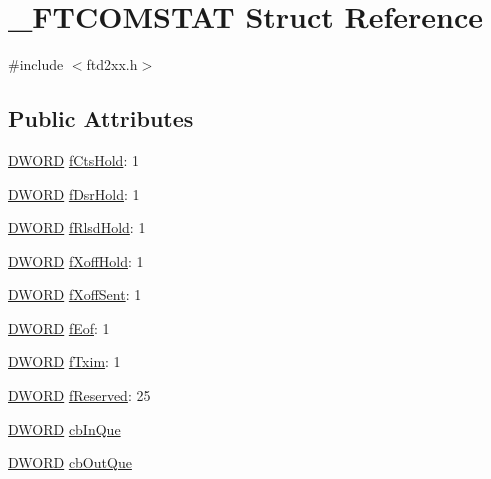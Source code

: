 \hypertarget{struct__FTCOMSTAT}{}\section{\+\_\+\+F\+T\+C\+O\+M\+S\+T\+AT Struct Reference}
\label{struct__FTCOMSTAT}


{\ttfamily \#include $<$ftd2xx.\+h$>$}

\subsection*{Public Attributes}
\begin{DoxyCompactItemize}
\item 
\hyperlink{CatCaloProto40MHz_2inc_2WinTypes_8h_ad342ac907eb044443153a22f964bf0af}{D\+W\+O\+RD} \hyperlink{struct__FTCOMSTAT_ad78060ad831dfa35a9e2db1103a54c3f}{f\+Cts\+Hold}\+: 1
\item 
\hyperlink{CatCaloProto40MHz_2inc_2WinTypes_8h_ad342ac907eb044443153a22f964bf0af}{D\+W\+O\+RD} \hyperlink{struct__FTCOMSTAT_a63c6ff1a00dd690b0bf9347c949a59c8}{f\+Dsr\+Hold}\+: 1
\item 
\hyperlink{CatCaloProto40MHz_2inc_2WinTypes_8h_ad342ac907eb044443153a22f964bf0af}{D\+W\+O\+RD} \hyperlink{struct__FTCOMSTAT_afb2b9a88896f528efbe6c9ff73b7744c}{f\+Rlsd\+Hold}\+: 1
\item 
\hyperlink{CatCaloProto40MHz_2inc_2WinTypes_8h_ad342ac907eb044443153a22f964bf0af}{D\+W\+O\+RD} \hyperlink{struct__FTCOMSTAT_a5b2fd786cc95e60df49aa55f7d4d7d5a}{f\+Xoff\+Hold}\+: 1
\item 
\hyperlink{CatCaloProto40MHz_2inc_2WinTypes_8h_ad342ac907eb044443153a22f964bf0af}{D\+W\+O\+RD} \hyperlink{struct__FTCOMSTAT_a5a28cf3c2aea49110593931c78934416}{f\+Xoff\+Sent}\+: 1
\item 
\hyperlink{CatCaloProto40MHz_2inc_2WinTypes_8h_ad342ac907eb044443153a22f964bf0af}{D\+W\+O\+RD} \hyperlink{struct__FTCOMSTAT_a2a4cdfc245e72f74b032f7a5cc220fd3}{f\+Eof}\+: 1
\item 
\hyperlink{CatCaloProto40MHz_2inc_2WinTypes_8h_ad342ac907eb044443153a22f964bf0af}{D\+W\+O\+RD} \hyperlink{struct__FTCOMSTAT_a04853d07abaf4fb47891a3bbdd78be8d}{f\+Txim}\+: 1
\item 
\hyperlink{CatCaloProto40MHz_2inc_2WinTypes_8h_ad342ac907eb044443153a22f964bf0af}{D\+W\+O\+RD} \hyperlink{struct__FTCOMSTAT_a567f611e7f3dc193ff94ac4c44fbc500}{f\+Reserved}\+: 25
\item 
\hyperlink{CatCaloProto40MHz_2inc_2WinTypes_8h_ad342ac907eb044443153a22f964bf0af}{D\+W\+O\+RD} \hyperlink{struct__FTCOMSTAT_a995717c2425e3e52f046565bb60fbb3d}{cb\+In\+Que}
\item 
\hyperlink{CatCaloProto40MHz_2inc_2WinTypes_8h_ad342ac907eb044443153a22f964bf0af}{D\+W\+O\+RD} \hyperlink{struct__FTCOMSTAT_ab0fbaa7889620e204d2f583b6e31f848}{cb\+Out\+Que}
\end{DoxyCompactItemize}


